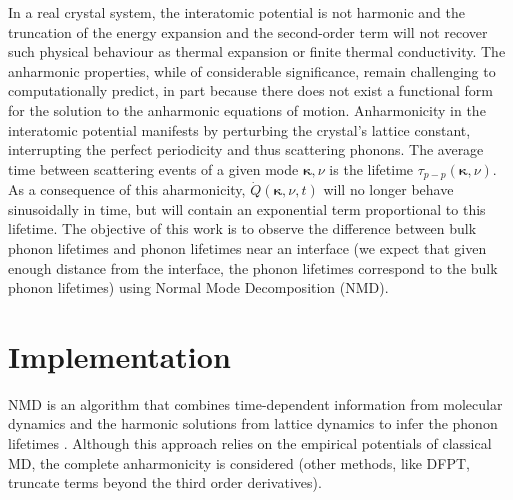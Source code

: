 \documentclass{article}
\begin{document}
In a real crystal system, the interatomic potential is not harmonic and the truncation of the energy expansion and the second-order term will not recover such physical behaviour as thermal expansion or finite thermal conductivity. The anharmonic properties, while of considerable significance, remain challenging to computationally predict, in part because there does not exist a functional form for the solution to the anharmonic equations of motion. Anharmonicity in the interatomic potential manifests by perturbing the crystal's lattice constant, interrupting the perfect periodicity and thus scattering phonons. The average time between scattering events of a given mode $\pmb{\kappa},\nu$ is the lifetime $\tau_{p-p}(\pmb{\kappa}, \nu)$. As a consequence of this aharmonicity, $\dot{Q}(\pmb{\kappa},\nu,t)$ will no longer behave sinusoidally in time, but will contain an exponential term proportional to this lifetime. The objective of this work is to observe the difference between bulk phonon lifetimes and phonon lifetimes near an interface (we expect that given enough distance from the interface, the phonon lifetimes correspond to the bulk phonon lifetimes) using Normal Mode Decomposition (NMD).

\section*{Implementation}

NMD is an algorithm that combines time-dependent information from molecular dynamics and the harmonic solutions from lattice dynamics to infer the phonon lifetimes \cite{larkin}. Although this approach relies on the empirical potentials of classical MD, the complete anharmonicity is considered (other methods, like DFPT, truncate terms beyond the third order derivatives).
\end{document}
